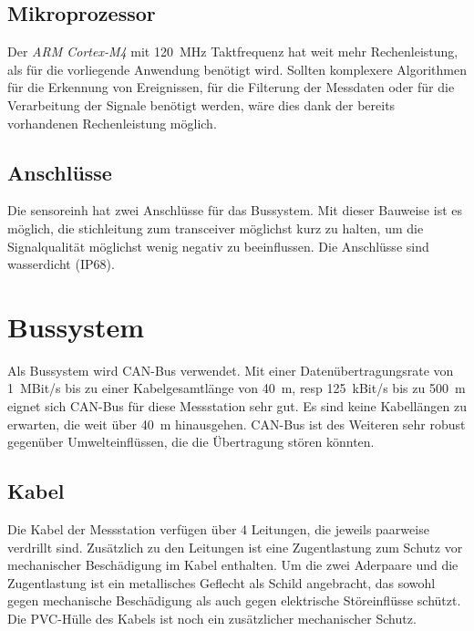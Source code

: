 \subsection{Mikroprozessor}
Der \emph{ARM Cortex-M4} mit 120~MHz Taktfrequenz hat weit mehr Rechenleistung, als für die vorliegende Anwendung benötigt wird. Sollten komplexere Algorithmen für die Erkennung von Ereignissen, für die Filterung der Messdaten oder für die Verarbeitung der Signale benötigt werden, wäre dies dank der bereits vorhandenen Rechenleistung möglich.

\subsection{Anschlüsse}
Die \gls{sensoreinh} hat zwei Anschlüsse für das Bussystem. Mit dieser Bauweise ist es möglich, die \gls{stichleitung} zum \gls{transceiver} möglichst kurz zu halten, um die Signalqualität möglichst wenig negativ zu beeinflussen. Die Anschlüsse sind wasserdicht (IP68).














\section{Bussystem}\label{sec.manualbus}
Als Bussystem wird CAN-Bus verwendet. Mit einer Datenübertragungsrate von 1~MBit/s bis zu einer Kabelgesamtlänge von 40~m, resp 125~kBit/s bis zu 500~m eignet sich CAN-Bus für diese Messstation sehr gut. Es sind keine Kabellängen zu erwarten, die weit über 40~m hinausgehen. CAN-Bus ist des Weiteren sehr robust gegenüber Umwelteinflüssen, die die Übertragung stören könnten.

\subsection{Kabel}
Die Kabel der Messstation verfügen über 4 Leitungen, die jeweils paarweise verdrillt sind. Zusätzlich zu den Leitungen ist eine Zugentlastung zum Schutz vor mechanischer Beschädigung im Kabel enthalten. Um die zwei Aderpaare und die Zugentlastung ist ein metallisches Geflecht als Schild angebracht, das sowohl gegen mechanische Beschädigung als auch gegen elektrische Störeinflüsse schützt. Die PVC-Hülle des Kabels ist noch ein zusätzlicher mechanischer Schutz. 


